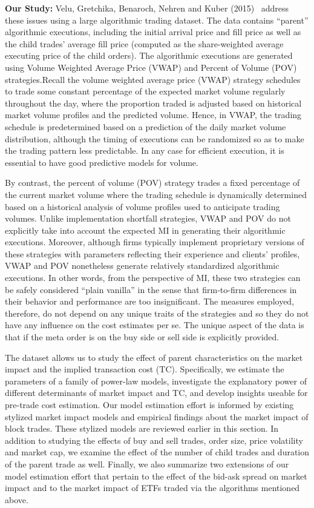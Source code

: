 \noindent\textbf{Our Study:} Velu, Gretchika, Benaroch, Nehren and Kuber (2015)~\cite{unpub} address these issues using a large algorithmic trading dataset. The data contains ``parent'' algorithmic executions, including the initial arrival price and fill price as well as the child trades' average fill price (computed as the share-weighted average executing price of the child orders). The algorithmic executions are generated using Volume Weighted Average Price (VWAP) and Percent of Volume (POV) strategies.Recall the volume weighted average price (VWAP) strategy schedules to trade some constant percentage of the expected market volume regularly throughout the day, where the proportion traded is adjusted based on historical market volume profiles and the predicted volume. Hence, in VWAP, the trading schedule is predetermined based on a prediction of the daily market volume distribution, although the timing of executions can be randomized so as to make the trading pattern less predictable. In any case for efficient execution, it is essential to have good predictive models for volume. 


By contrast, the percent of volume (POV) strategy trades a fixed percentage of the current market volume where the trading schedule is dynamically determined based on a historical analysis of volume profiles used to anticipate trading volumes. Unlike implementation shortfall strategies, VWAP and POV do not explicitly take into account the expected MI in generating their algorithmic executions. Moreover, although firms typically implement proprietary versions of these strategies with parameters reflecting their experience and clients' profiles, VWAP and POV nonetheless generate relatively standardized algorithmic executions. In other words, from the perspective of MI, these two strategies can be safely considered ``plain vanilla'' in the sense that firm-to-firm differences in their behavior and performance are too insignificant. The measures employed, therefore, do not depend on any unique traits of the strategies and so they do not have any influence on the cost estimates per se. The unique aspect of the data is that if the meta order is on the buy side or sell side is explicitly provided. 


The dataset allows us to study the effect of parent characteristics on the market impact and the implied transaction cost (TC). Specifically, we estimate the parameters of a family of power-law models, investigate the explanatory power of different determinants of market impact and TC, and develop insights useable for pre-trade cost estimation. Our model estimation effort is informed by existing stylized market impact models and empirical findings about the market impact of block trades. These stylized models are reviewed earlier in this section. In addition to studying the effects of buy and sell trades, order size, price volatility and market cap, we examine the effect of the number of child trades and duration of the parent trade as well. Finally, we also summarize two extensions of our model estimation effort that pertain to the effect of the bid-ask spread on market impact and to the market impact of ETFs traded via the algorithms mentioned above.


